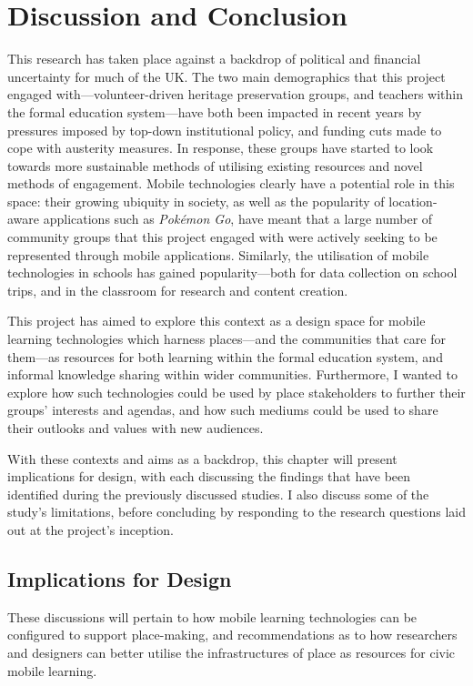 \chapter{Discussion and Conclusion}
\label{chap:discussionConclusion}

This research has taken place against a backdrop of political and financial uncertainty for much of the UK. The two main demographics that this project engaged with---volunteer-driven heritage preservation groups, and teachers within the formal education system---have both been impacted in recent years by pressures imposed by top-down institutional policy, and funding cuts made to cope with austerity measures. In response, these groups have started to look towards more sustainable methods of utilising existing resources and novel methods of engagement. Mobile technologies clearly have a potential role in this space: their growing ubiquity in society, as well as the popularity of location-aware applications such as \textit{Pok\'emon Go}, have meant that a large number of community groups that this project engaged with were actively seeking to be represented through mobile applications. Similarly, the utilisation of mobile technologies in schools has gained popularity---both for data collection on school trips, and in the classroom for research and content creation.

This project has aimed to explore this context as a design space for mobile learning technologies which harness places---and the communities that care for them---as resources for both learning within the formal education system, and informal knowledge sharing within wider communities. Furthermore, I wanted to explore how such technologies could be used by place stakeholders to further their groups' interests and agendas, and how such mediums could be used to share their outlooks and values with new audiences.

With these contexts and aims as a backdrop, this chapter will present implications for design, with each discussing the findings that have been identified during the previously discussed studies. I also discuss some of the study's limitations, before concluding by responding to the research questions laid out at the project's inception.

\section{Implications for Design}

These discussions will pertain to how mobile learning technologies can be configured to support place-making, and recommendations as to how researchers and designers can better utilise the infrastructures of place as resources for civic mobile learning.

